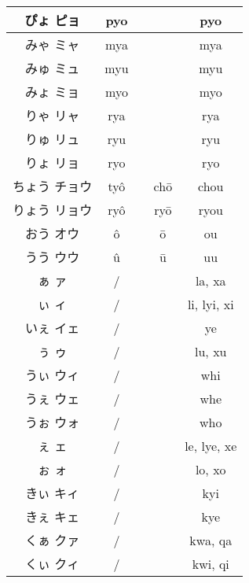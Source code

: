 \documentclass{article}
\begin{document}
\begin{center}
\begin{japanese}
\begin{longtable}{|c|c c c|c|}
                ぴょ ピョ & pyo &&& pyo \\ \hline
                みゃ ミャ & mya &&& mya \\ \hline
                みゅ ミュ & myu &&& myu \\ \hline
                みょ ミョ & myo &&& myo \\ \hline
                りゃ リャ & rya &&& rya \\ \hline
                りゅ リュ & ryu &&& ryu \\ \hline
                りょ リョ & ryo &&& ryo \\ \hline
                ちょう チョウ & tyô && chō & chou \\ \hline
                りょう リョウ & ryô && ryō & ryou \\ \hline
                おう オウ & ô && ō & ou \\ \hline
                うう ウウ & û && ū & uu \\ \hline
                ぁ ァ & / &&& la, xa \\ \hline
                ぃ ィ & / &&& li, lyi, xi \\ \hline
                いぇ イェ & / &&& ye \\ \hline
                ぅ ゥ & / &&& lu, xu \\ \hline
                うぃ ウィ & / &&& whi \\ \hline
                うぇ ウェ & / &&& whe \\ \hline
                うぉ ウォ & / &&& who \\ \hline
                ぇ ェ & / &&& le, lye, xe \\ \hline
                ぉ ォ & / &&& lo, xo \\ \hline
                きぃ キィ & / &&& kyi \\ \hline
                きぇ キェ & / &&& kye \\ \hline
                くぁ クァ & / &&& kwa, qa \\ \hline
                くぃ クィ & / &&& kwi, qi \\ \hline

\end{longtable}
\end{japanese}
\end{center}
\end{document}
